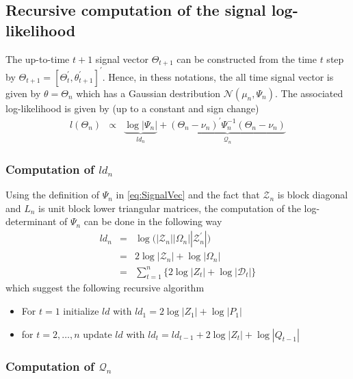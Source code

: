 \documentclass{article}
\begin{document}
\subsection{Recursive computation of the signal log-likelihood}

The up-to-time $t+1$ signal vector $\varTheta_{t+1}$ can be constructed from the time $t$
step by $\varTheta_{t+1}=[\varTheta_t^\prime,\theta_{t+1}^\prime]^\prime$. Hence, in thess
notations, the all time signal vector is given by $\theta = \varTheta_{n} $ which has a
Gaussian destribution $\mathcal{N}(\mu_n,\varPsi_n)$. The associated log-likelihood is given
by (up to a constant and sign change)
\begin{equation}
  \begin{array}{rcl}
    l (\varTheta_n) & \propto & \underbrace{\log |\varPsi_n|}_{ld_n} + \underbrace{(\varTheta_n - \nu_n)^\prime \varPsi_n^{-1} (\varTheta_n - \nu_n)}_{\mathcal{Q}_n}
  \end{array}
\end{equation}

\subsubsection*{Computation of $ld_n$}

Using the definition of $\varPsi_n$ in \eqref{eq:SignalVec} and the fact that $\mathcal{Z}_n$
is block diagonal and $L_n$ is unit block lower triangular matrices, the computation of the
log-determinant of $\varPsi_n$ can be done in the following way
\begin{equation}
  \begin{array}{rcl}
    ld_n & = & \log \Big ( |\mathcal{Z}_n| |\Omega_n| |\mathcal{Z}_n^\prime|     \Big ) \\
         & = & 2 \log |\mathcal{Z}_n| + \log |\Omega_n| \\
         & = & \displaystyle \sum_{t=1}^n  \Big \{ 2 \log |Z_t| + \log |\mathcal{D}_t| \Big \}
  \end{array}
\end{equation}
which suggest the following recursive algorithm
\begin{itemize}
  \item For $t=1$ initialize $ld$ with $ld_1= 2 \log |Z_1| + \log |P_1|$
  \item for $t=2,\dots,n$ update $ld$ with $ld_{t} = ld_{t-1} + 2 \log |Z_t| + \log |Q_{t-1}|$
\end{itemize}

\subsubsection*{Computation of $\mathcal{Q}_n$}
\end{document}
